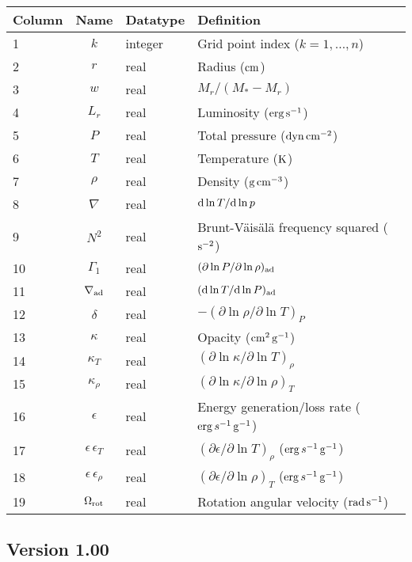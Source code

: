 \documentclass{article}
\newcommand{\diff}{\ensuremath{{\rm d}}}
\newcommand{\Mstar}{\ensuremath{M_{\ast}}}
\newcommand{\cm}{\ensuremath{{\rm cm}}}
\newcommand{\gram}{\ensuremath{{\rm g}}}
\newcommand{\second}{\ensuremath{{\rm s}}}
\newcommand{\dyne}{\ensuremath{{\rm dyn}}}
\newcommand{\erg}{\ensuremath{{\rm erg}}}
\newcommand{\kelvin}{\ensuremath{{\rm K}}}
\begin{document}
\begin{table}[h!]
\begin{tabular}{|l|c|l|l|} \hline
Column & Name & Datatype & Definition \\ \hline
1      & $k$ & integer & Grid point index ($k=1,\ldots,n$) \\
2      & $r$ & real    & Radius ($\cm$) \\
3      & $w$ & real    & $M_{r}/(\Mstar-M_{r})$ \\
4      & $L_{r}$ & real & Luminosity ($\erg\,\second^{-1}$) \\
5      & $P$ & real    & Total pressure ($\dyne\,\cm^{-2}$) \\
6      & $T$ & real    & Temperature ($\kelvin$) \\
7      & $\rho$ & real & Density ($\gram\,\cm^{-3}$) \\
8      & $\nabla$ & real & $\diff \ln T/\diff \ln p$ \\
9      & $N^{2}$ & real & Brunt-V\"ais\"al\"a frequency squared ($\second^{-2}$) \\
10     & $\Gamma_{1}$ & real & $(\partial \ln P/\partial \ln \rho)_{\rm ad}$ \\
11     & $\nabla_{\rm ad}$ & real & $(\diff \ln T/\diff \ln P)_{\rm ad}$ \\
12     & $\delta$ & real & $-(\partial \ln \rho/\partial \ln T)_{P}$  \\
13     & $\kappa$ & real & Opacity ($\cm^{2}\,\gram^{-1}$) \\
14     & $\kappa_{T}$ & real & $(\partial \ln \kappa/\partial \ln T)_{\rho}$ \\
15     & $\kappa_{\rho}$ & real & $(\partial \ln \kappa/\partial \ln \rho)_{T}$ \\
16     & $\epsilon$ & real & Energy generation/loss rate ($\erg\,s^{-1}\,\gram^{-1}$) \\
17     & $\epsilon\,\epsilon_{T}$ & real & $(\partial \epsilon/\partial \ln T)_{\rho}$ ($\erg\,s^{-1}\,\gram^{-1}$) \\
18     & $\epsilon\,\epsilon_{\rho}$ & real & $(\partial \epsilon/\partial \ln \rho)_{T}$ ($\erg\,s^{-1}\,\gram^{-1}$) \\
19     & $\Omega_{\rm rot}$ & real & Rotation angular velocity (${\rm rad}\,\second^{-1}$) \\  \hline
\end{tabular}
\end{table}

\subsection*{Version 1.00}
\end{document}
